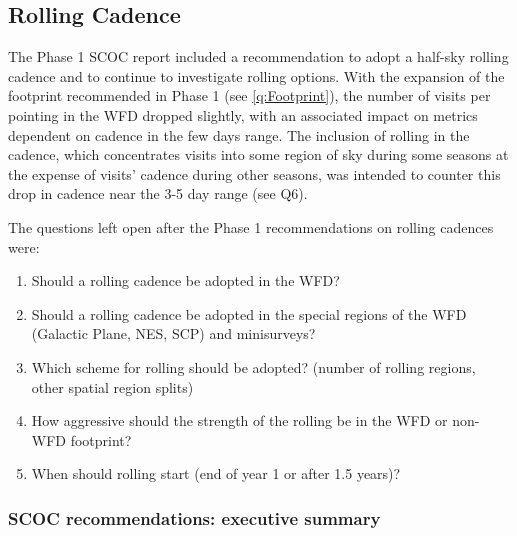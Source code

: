 \subsection{Rolling Cadence} \label{q:Rolling}

The Phase 1 SCOC report included a recommendation to adopt a half-sky rolling cadence and to continue to investigate rolling options. With the expansion of the footprint recommended in Phase 1 (see \autoref{q:Footprint}), the number of visits per pointing in the WFD dropped slightly, with an associated impact on metrics dependent on cadence in the few days range. The inclusion of rolling in the cadence, which concentrates visits into some region of sky during some seasons at the expense of visits' cadence during other seasons, was intended to counter this drop in cadence near the 3-5 day range (see  Q6).


The questions left open after the Phase 1 recommendations on rolling cadences were: 

\begin{enumerate}
\item Should a rolling cadence be adopted in the WFD?
\item Should a rolling cadence be adopted in the special regions of the WFD (Galactic Plane, NES, SCP) and minisurveys?
\item Which scheme for rolling should be adopted? (number of rolling regions, other spatial region splits)
\item How aggressive should the strength of the rolling be in the WFD or non-WFD footprint?
\item When should rolling start (end of year 1 or after 1.5 years)?
\end{enumerate}

\subsubsection{SCOC recommendations: executive summary}\label{sec:rolling}

